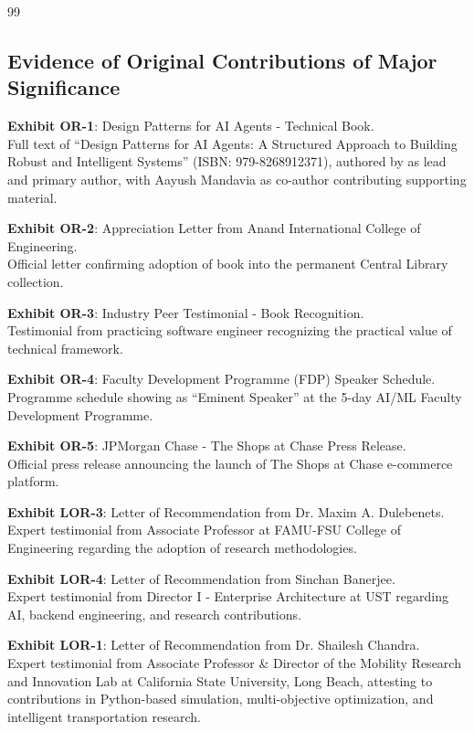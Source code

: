 \documentclass[11pt]{article}
\begin{document}
\begin{thebibliography}{99}

\subsection*{Evidence of Original Contributions of Major Significance}

\textbf{Exhibit OR-1}: Design Patterns for AI Agents - Technical Book.
\\Full text of ``Design Patterns for AI Agents: A Structured Approach to Building Robust and Intelligent Systems'' (ISBN: 979-8268912371), authored by \dr as lead and primary author, with Aayush Mandavia as co-author contributing supporting material.

\textbf{Exhibit OR-2}: Appreciation Letter from Anand International College of Engineering.
\\Official letter confirming adoption of \drs book into the permanent Central Library collection.

\textbf{Exhibit OR-3}: Industry Peer Testimonial - Book Recognition.
\\Testimonial from practicing software engineer recognizing the practical value of \drs technical framework.

\textbf{Exhibit OR-4}: Faculty Development Programme (FDP) Speaker Schedule.
\\Programme schedule showing \dr as ``Eminent Speaker'' at the 5-day AI/ML Faculty Development Programme.

\textbf{Exhibit OR-5}: JPMorgan Chase - The Shops at Chase Press Release.
\\Official press release announcing the launch of The Shops at Chase e-commerce platform.

\textbf{Exhibit LOR-3}: Letter of Recommendation from Dr. Maxim A. Dulebenets.
\\Expert testimonial from Associate Professor at FAMU-FSU College of Engineering regarding the adoption of \drs research methodologies.

\textbf{Exhibit LOR-4}: Letter of Recommendation from Sinchan Banerjee.
\\Expert testimonial from Director I - Enterprise Architecture at UST regarding \drs AI, backend engineering, and research contributions.

\textbf{Exhibit LOR-1}: Letter of Recommendation from Dr. Shailesh Chandra.
\\Expert testimonial from Associate Professor \& Director of the Mobility Research and Innovation Lab at California State University, Long Beach, attesting to \drs contributions in Python-based simulation, multi-objective optimization, and intelligent transportation research.


\end{thebibliography}
\end{document}
